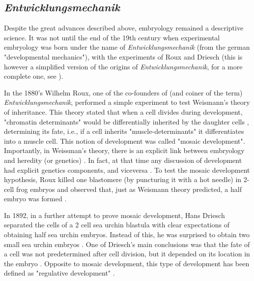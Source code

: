 \subsection{\textit{Entwicklungsmechanik}}

Despite the great advances described above, embryology remained a descriptive science. 
It was not until the end of the 19th century when experimental embryology was born under the name of \textit{Entwicklungsmechanik} (from the german "developmental mechanics"), with the experiments of Roux and Driesch (this is however a simplified version of the origins of \textit{Entwicklungsmechanik}, for a more complete one, see \citealp{Maienschein1991}).

In the 1880's Wilhelm Roux, one of the co-founders of (and coiner of the term) \textit{Entwicklungsmechanik}, performed a simple experiment to test Weismann's theory of inheritance.
%
This theory stated that when a cell divides during development, "chromatin determinants" would be differentially inherited by the daughter cells \citep{Weismann1893}, determining its fate, i.e., if a cell inherits "muscle-determinants" it differentiates into a muscle cell.
This notion of development %
was called "mosaic development".
Importantly, in Weissman's theory, there is an explicit link between embryology and heredity (or genetics) \citep{gilbert1991conceptual}. In fact, at that time any discussion of development had explicit genetics components, and viceversa \citep{gilbert1991conceptual}.
%
%
To test the mosaic development hypothesis, Roux killed one blastomere (by puncturing it with a hot needle) in 2-cell frog embryos and observed that, just as Weismann theory predicted, a half embryo was formed \citep{Roux1888}.

In 1892, in a further attempt to prove mosaic development, Hans Driesch separated the cells of a 2 cell sea urchin blastula with clear expectations of obtaining half sea urchin embryos. 
Instead of this, he was surprised to obtain two small sea urchin embryos \citep{Driesch1892}. One of Driesch's main conclusions was that the fate of a cell was not predetermined after cell division, but it depended on its location in the embryo \citep{driesch1894analytische}. 
Opposite to mosaic development, this type of development has been defined as "regulative development" \citep{Gilbert2014}.

